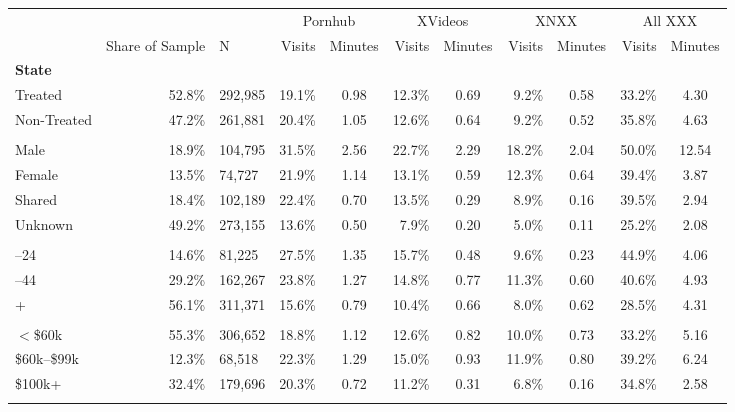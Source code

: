 \begin{tabular}{lrl@{\hskip 15pt}r@{\hskip 3pt}cr@{\hskip 3pt}cr@{\hskip 3pt}cr@{\hskip 3pt}c}
\toprule
 & & & \multicolumn{2}{c}{Pornhub} & \multicolumn{2}{c}{XVideos} & \multicolumn{2}{c}{XNXX} & \multicolumn{2}{c}{All XXX} \\
\cmidrule(r){4-5}\cmidrule(r){6-7}\cmidrule(r){8-9}\cmidrule(r){10-11}
 & Share of Sample & N & Visits & Minutes & Visits & Minutes & Visits & Minutes & Visits & Minutes \\
\midrule
\multicolumn{11}{l}{\textbf{State}} \\
\quad Treated & 52.8\% & 292,985 & 19.1\% & 0.98 & 12.3\% & 0.69 & 9.2\% & 0.58 & 33.2\% & 4.30 \\
\quad Non-Treated & 47.2\% & 261,881 & 20.4\% & 1.05 & 12.6\% & 0.64 & 9.2\% & 0.52 & 35.8\% & 4.63 \\
\addlinespace
\multicolumn{11}{l}{\textbf{Gender}} \\
\quad Male & 18.9\% & 104,795 & 31.5\% & 2.56 & 22.7\% & 2.29 & 18.2\% & 2.04 & 50.0\% & 12.54 \\
\quad Female & 13.5\% & 74,727 & 21.9\% & 1.14 & 13.1\% & 0.59 & 12.3\% & 0.64 & 39.4\% & 3.87 \\
\quad Shared & 18.4\% & 102,189 & 22.4\% & 0.70 & 13.5\% & 0.29 & 8.9\% & 0.16 & 39.5\% & 2.94 \\
\quad Unknown & 49.2\% & 273,155 & 13.6\% & 0.50 & 7.9\% & 0.20 & 5.0\% & 0.11 & 25.2\% & 2.08 \\
\addlinespace
\multicolumn{11}{l}{\textbf{Age}} \\
\quad 18--24 & 14.6\% & 81,225 & 27.5\% & 1.35 & 15.7\% & 0.48 & 9.6\% & 0.23 & 44.9\% & 4.06 \\
\quad 25--44 & 29.2\% & 162,267 & 23.8\% & 1.27 & 14.8\% & 0.77 & 11.3\% & 0.60 & 40.6\% & 4.93 \\
\quad 45+ & 56.1\% & 311,371 & 15.6\% & 0.79 & 10.4\% & 0.66 & 8.0\% & 0.62 & 28.5\% & 4.31 \\
\addlinespace
\multicolumn{11}{l}{\textbf{Household Income}} \\
\quad $<$\$60k & 55.3\% & 306,652 & 18.8\% & 1.12 & 12.6\% & 0.82 & 10.0\% & 0.73 & 33.2\% & 5.16 \\
\quad \$60k--\$99k & 12.3\% & 68,518 & 22.3\% & 1.29 & 15.0\% & 0.93 & 11.9\% & 0.80 & 39.2\% & 6.24 \\
\quad \$100k+ & 32.4\% & 179,696 & 20.3\% & 0.72 & 11.2\% & 0.31 & 6.8\% & 0.16 & 34.8\% & 2.58 \\
\addlinespace
\multicolumn{11}{l}{\textbf{Children Present}} \\

\end{tabular}
